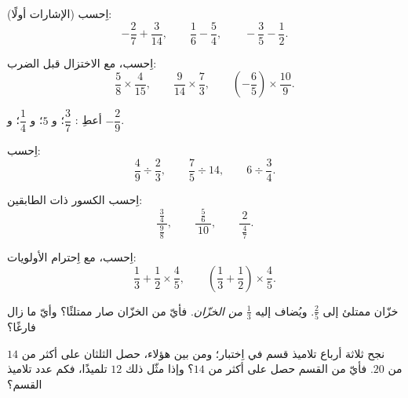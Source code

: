 \begin{exercise}[$\star$]\label{exo:g8:fractions:2}
اِحسب (الإشارات أولًا):
\[
-\frac{2}{7} + \frac{3}{14}, \qquad
\frac{1}{6} - \frac{5}{4}, \qquad
-\frac{3}{5} - \frac{1}{2} .
\]
\end{exercise}

\begin{exercise}[$\star$]\label{exo:g8:fractions:3}
اِحسب، مع الاختزال قبل الضرب:
\[
\frac{5}{8} \times \frac{4}{15}, \qquad
\frac{9}{14} \times \frac{7}{3}, \qquad
\left(-\frac{6}{5}\right) \times \frac{10}{9} .
\]
\end{exercise}

\begin{exercise}[$\star$]\label{exo:g8:fractions:4}
أعطِ : $\dfrac{3}{7}$؛ \quad و $5$؛ \quad
و $\dfrac{1}{4}$؛ \quad و $-\dfrac{2}{9}$.
\end{exercise}

\begin{exercise}[$\star$]\label{exo:g8:fractions:5}
اِحسب:
\[
\frac{4}{9} \div \frac{2}{3}, \qquad
\frac{7}{5} \div 14, \qquad
6 \div \frac{3}{4} .
\]
\end{exercise}

\begin{exercise}[$\star$]\label{exo:g8:fractions:6}
اِحسب الكسور ذات الطابقين:
\[
\frac{\ \frac{3}{4}\ }{\ \frac{9}{8}\ },
\qquad
\frac{\ \frac{5}{6}\ }{\ 10\ },
\qquad
\frac{\ 2\ }{\ \frac{4}{7}\ } .
\]
\end{exercise}

\begin{exercise}[$\star$]\label{exo:g8:fractions:7}
اِحسب، مع اِحترام الأولويات:
\[
\frac{1}{3} + \frac{1}{2} \times \frac{4}{5},
\qquad
\left(\frac{1}{3} + \frac{1}{2}\right) \times \frac{4}{5} .
\]
\end{exercise}

\begin{exercise}[$\star\star$]\label{exo:g8:fractions:8}
خزّان ممتلئ إلى $\frac{2}{5}$. ويُضاف إليه $\frac{1}{3}$ \emph{من
 الخزّان}. فأيّ  من الخزّان صار ممتلئًا؟ وأيّ
 ما زال فارغًا؟
\end{exercise}

\begin{exercise}[$\star\star$]\label{exo:g8:fractions:9}
نجح ثلاثة أرباع تلاميذ قسم في اِختبار؛ ومن بين هؤلاء،
حصل الثلثان على أكثر من $14$ من $20$. فأيّ  من القسم
حصل على أكثر من $14$؟ وإذا مثّل ذلك $12$ تلميذًا، فكم عدد
تلاميذ القسم؟
\end{exercise}

